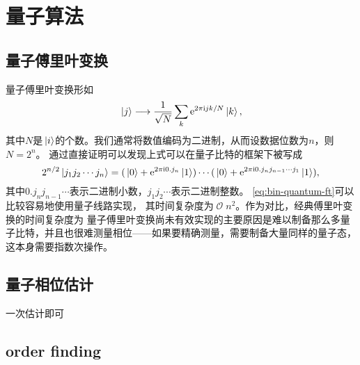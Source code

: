 \documentclass[hyperref, UTF8, a4paper]{ctexart}
\newcommand*{\ii}{\mathrm{i}}
\newcommand*{\ee}{\mathrm{e}}
\DeclareMathOperator{\bigO}{\mathcal{O}}
\begin{document}
\section{量子算法}

\subsection{量子傅里叶变换}

量子傅里叶变换形如
\begin{equation}
    \ket*{j} \longrightarrow \frac{1}{\sqrt{N}} \sum_k \ee^{2 \pi \ii j k / N} \ket*{k},
\end{equation}
其中$N$是$\ket*{i}$的个数。我们通常将数值编码为二进制，从而设数据位数为$n$，则$N=2^n$。
通过直接证明可以发现上式可以在量子比特的框架下被写成
\begin{equation}
    2^{n/2} \ket*{j_1 j_2 \cdots j_n} = (\ket*{0} + \ee^{2\pi \ii 0.j_n} \ket*{1}) \cdots (\ket*{0} + \ee^{2 \pi \ii 0.j_n j_{n-1} \cdots j_1} \ket*{1}),
    \label{eq:bin-quantum-ft}
\end{equation}
其中$0.j_n j_{n-1} \cdots$表示二进制小数，$j_1 j_2 \cdots$表示二进制整数。
\eqref{eq:bin-quantum-ft}可以比较容易地使用量子线路实现，
其时间复杂度为$\bigO{n^2}$。作为对比，经典傅里叶变换的时间复杂度为
量子傅里叶变换尚未有效实现的主要原因是难以制备那么多量子比特，并且也很难测量相位——如果要精确测量，需要制备大量同样的量子态，这本身需要指数次操作。

\subsection{量子相位估计}

一次估计即可

\subsection{order finding}
\end{document}
